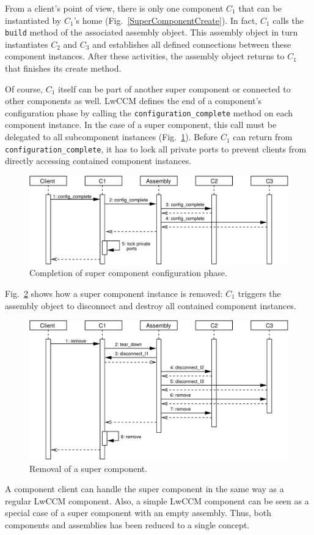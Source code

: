 \noindent
From a client's point of view, there is only one component $C_1$ that can be
instantiated by $C_1$'s home (Fig.~\ref{SuperComponentCreate}).
In fact, $C_1$ calls the {\tt build} method of the associated assembly object.
This assembly object in turn instantiates $C_2$ and $C_3$ and establishes all 
defined connections between these component instances.
After these activities, the assembly object returns to $C_1$ that finishes 
its create method.

Of course, $C_1$ itself can be part of another super component or connected 
to other components as well.
LwCCM defines the end of a component's configuration phase by calling the
{\tt configuration\_complete} method on each component instance.
In the case of a super component, this call must be delegated to all 
subcomponent instances (Fig.~\ref{SuperComponentConfigurationComplete}).
Before $C_1$ can return from {\tt configuration\_complete}, it has to lock all
private ports to prevent clients from directly accessing contained component 
instances.

\begin{figure}[htb]
    \begin{center}
    \includegraphics [width=12cm,angle=0] 
		     {ComponentModel/figures/SuperComponentConfigurationComplete}
    \caption{Completion of super component configuration phase.}
    \label{SuperComponentConfigurationComplete}
    \end{center}
\end{figure}

\noindent
Fig.~\ref{SuperComponentRemove} shows how a super component instance is removed:
$C_1$ triggers the assembly object to disconnect and destroy
all contained component instances.

\begin{figure}[htb]
    \begin{center}
    \includegraphics [width=12cm,angle=0] {ComponentModel/figures/SuperComponentRemove}
    \caption{Removal of a super component.}
    \label{SuperComponentRemove}
    \end{center}
\end{figure}

\noindent
A component client can handle
the super component in the same way as a regular LwCCM component.
Also, a simple LwCCM component can be seen as a special case of a super
component with an empty assembly.
Thus, both components and assemblies has been reduced to a single concept.

